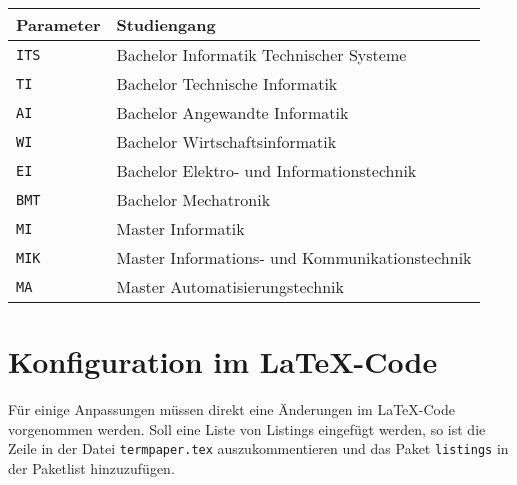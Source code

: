 \begin{center}
  \begin {tabular}{ll}
    Parameter & Studiengang \\
    \hline
    \texttt{ITS} & Bachelor Informatik Technischer Systeme \\
    \texttt{TI} & Bachelor Technische Informatik \\
    \texttt{AI} & Bachelor Angewandte Informatik \\
    \texttt{WI} & Bachelor Wirtschaftsinformatik \\
    \texttt{EI} & Bachelor Elektro- und Informationstechnik \\
    \texttt{BMT} & Bachelor Mechatronik \\
    \texttt{MI} & Master Informatik \\
    \texttt{MIK} & Master Informations- und Kommunikationstechnik \\
    \texttt{MA} & Master Automatisierungstechnik \\
  \end{tabular}
\end{center}

\section{Konfiguration im \LaTeX -Code}\label{sec:codechanges}
Für einige Anpassungen müssen direkt eine Änderungen im \LaTeX -Code vorgenommen werden. Soll eine Liste von Listings eingefügt werden, so ist die Zeile in der Datei \texttt{termpaper.tex} auszukommentieren und das Paket \texttt{listings} in der Paketlist hinzuzufügen.
